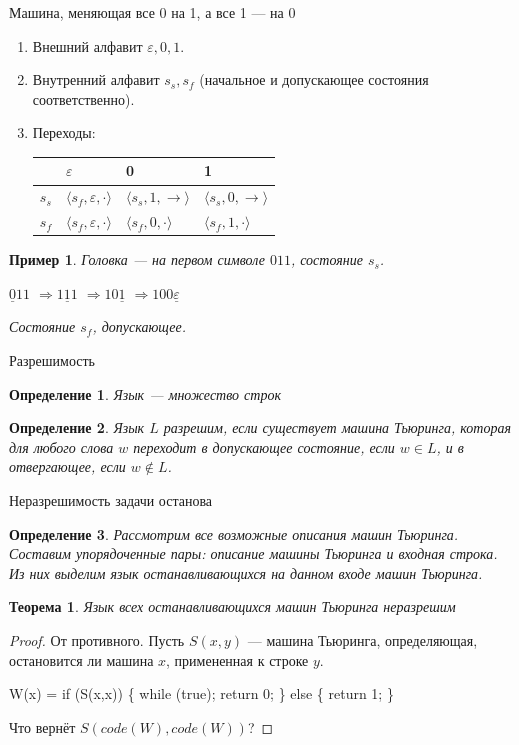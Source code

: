 \documentclass[aspectratio=169]{beamer}
\newtheorem{thm}{Теорема}[section]
\newtheorem{dfn}{Определение}[section]
\newtheorem{exmp}{Пример}[section]
\begin{document}
\begin{frame}{Машина, меняющая все 0 на 1, а все 1 --- на 0}
\begin{enumerate}
\item Внешний алфавит $\varepsilon, 0, 1$.
\item Внутренний алфавит $s_s, s_f$ (начальное и допускающее состояния соответственно).
\item Переходы:

\begin{tabular}{l|lll}
    & $\varepsilon$ & 0 & 1\\\hline
$s_s$ & $\langle s_f,\varepsilon,\cdot\rangle$ & $\langle s_s,1,\rightarrow\rangle$ & $\langle s_s,0,\rightarrow\rangle$\\
$s_f$ & $\langle s_f,\varepsilon,\cdot\rangle$ & $\langle s_f,0,\cdot\rangle$ & $\langle s_f,1,\cdot\rangle$
\end{tabular}
\end{enumerate}\pause

\begin{exmp}
Головка --- на первом символе $011$, состояние $s_s$.\pause

$\underline{0}11$ \pause $\Rightarrow 1\underline{1}1$ \pause $\Rightarrow 10\underline{1}$ \pause $\Rightarrow 100\underline{\varepsilon}$
\pause

Состояние $s_f$, допускающее.
\end{exmp}
\end{frame}

\begin{frame}{Разрешимость}
\begin{dfn}Язык --- множество строк\end{dfn}
\begin{dfn}Язык $L$ разрешим, если существует машина Тьюринга, которая для любого слова $w$ переходит в допускающее состояние, если $w \in L$,
и в отвергающее, если $w \notin L$.\end{dfn}
\end{frame}

\begin{frame}{Неразрешимость задачи останова}
\begin{dfn}Рассмотрим все возможные описания машин Тьюринга. Составим упорядоченные пары: описание машины Тьюринга и входная строка.
Из них выделим язык останавливающихся на данном входе машин Тьюринга.\end{dfn}
\begin{thm}Язык всех останавливающихся машин Тьюринга неразрешим\end{thm}
\begin{proof}От противного. Пусть $S(x,y)$ --- машина Тьюринга, определяющая, остановится ли машина $x$, примененная к строке $y$.\pause
\begin{center}W(x) = if (S(x,x)) \{ while (true); return 0; \} else \{ return 1; \}\end{center}\pause
Что вернёт $S(code(W),code(W))$?
\end{proof}
\end{frame}
\end{document}
